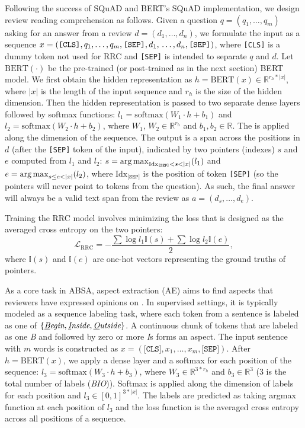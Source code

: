 Following the success of SQuAD \cite{rajpurkar2016squad} and BERT's SQuAD implementation, we design review reading comprehension as follows.
Given a question $q=(q_1, \dots, q_m)$ asking for an answer from a review $d=(d_1, \dots, d_n)$, we formulate the input as a sequence $x=(\texttt{[CLS]}, q_1, \dots, q_m, \texttt{[SEP]}, d_1, \\ \dots, d_n, \texttt{[SEP]})$, where \texttt{[CLS]} is a dummy token not used for RRC and \texttt{[SEP]} is intended to separate $q$ and $d$.
Let $\text{BERT}(\cdot)$ be the pre-trained (or post-trained as in the next section) BERT model. We first obtain the hidden representation as $h=\text{BERT}(x) \in \mathbb{R}^{r_h*|x|}$, where $|x|$ is the length of the input sequence and $r_h$ is the size of the hidden dimension. Then the hidden representation is passed to two separate dense layers followed by softmax functions: $l_1=\text{softmax}(W_1 \cdot h + b_1)$ and $l_2=\text{softmax}(W_2 \cdot h + b_2)$, where $W_1$, $W_2 \in \mathbb{R}^{r_h}$ and $b_1, b_2 \in \mathbb{R}$. The  is applied along the dimension of the sequence.
The output is a span across the positions in $d$ (after the \texttt{[SEP]} token of the input), indicated by two pointers (indexes) $s$ and $e$ computed from $l_1$ and $l_2$: $s=\argmax_{ \text{Idx}_{\texttt{[SEP]}} < s<|x|}(l_1)$ and $e=\argmax_{s\le e<|x|}(l_2)$, where $\text{Idx}_{\texttt{[SEP]}}$ is the position of token \texttt{[SEP]} (so the pointers will never point to tokens from the question).
As such, the final answer will always be a valid text span from the review as $a=(d_s, \dots, d_e)$.

Training the RRC model involves minimizing the loss that is designed as the averaged cross entropy on the two pointers: $$\mathcal{L}_{\text{RRC}}=-\frac{\sum \log l_1 \mathbb{I}(s)+ \sum \log l_2 \mathbb{I}(e)}{2},$$ where $\mathbb{I}(s)$ and $\mathbb{I}(e)$ are one-hot vectors representing the ground truths of pointers.

As a core task in ABSA, aspect extraction (AE) aims to find aspects that reviewers have expressed opinions on \cite{hu2004mining}. 
In supervised settings, it is typically modeled as a sequence labeling task, where each token from a sentence is labeled as one of $\{\textit{\underline{B}egin}, \textit{\underline{I}nside}, \textit{\underline{O}utside}\}$. A continuous chunk of tokens that are labeled as one \textit{B} and followed by zero or more \textit{I}s forms an aspect.
The input sentence with $m$ words is constructed as $x=(\texttt{[CLS]}, x_1, \dots, x_m, \texttt{[SEP]})$.
After $h=\text{BERT}(x)$, we apply a dense layer and a softmax for each position of the sequence: $l_3=\text{softmax}(W_3 \cdot h + b_3)$, where $W_3 \in \mathbb{R}^{3*r_h}$ and $b_3 \in \mathbb{R}^3$ (3 is the total number of labels (\textit{BIO})).  Softmax is applied along the dimension of labels for each position and $l_3 \in [0, 1]^{3*|x|}$. The labels are predicted as taking argmax function at each position of $l_3$ and the loss function is the averaged cross entropy across all positions of a sequence.

